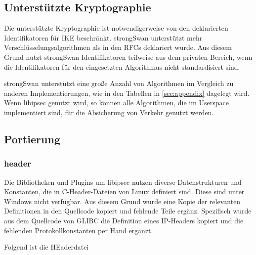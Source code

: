 \subsection{Unterstützte Kryptographie}
Die unterstützte Kryptographie ist notwendigerweise von den deklarierten Identifikatoren
für IKE beschränkt. strongSwan unterstützt mehr Verschlüsselungsalgorithmen als
in den \acp{RFC} deklariert wurde. Aus diesem Grund nutzt strongSwan Identifikatoren
teilweise aus dem privaten Bereich, wenn die Identifikatoren für den eingesetzten Algorithmus
nicht standardisiert sind.

strongSwan unterstützt eine große Anzahl von Algorithmen im Vergleich zu anderen Implementierungen,
wie in den Tabellen in \autoref{sec:appendix} dagelegt wird. Wenn libipsec genutzt wird,
so können alle Algorithmen, die im Userspace implementiert sind, für die Absicherung
von Verkehr genutzt werden.

\subsection{Portierung}
\subsubsection{header}
Die Bibliotheken und Plugins um libipsec nutzen diverse Datenstrukturen und Konstanten,
die in C-Header-Dateien von Linux definiert sind. Diese sind unter Windows nicht verfügbar.
Aus diesem Grund wurde eine Kopie der relevanten Definitionen in den Quellcode kopiert
und fehlende Teile ergänz.
Spezifisch wurde aus dem Quellcode von GLIBC die Definition eines \ac{IP}-Headers kopiert
und die fehlenden Protokollkonstanten per Hand ergänzt.

Folgend ist die HEaderdatei

